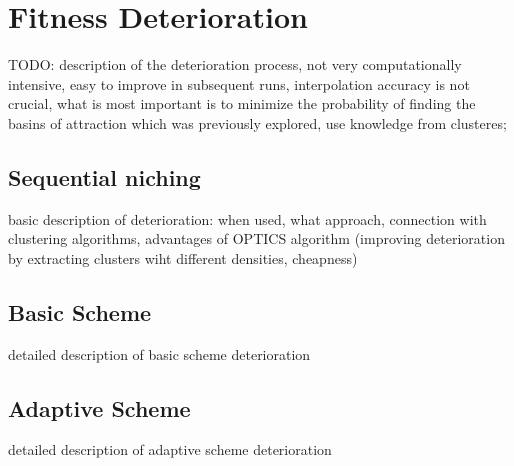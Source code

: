 

\chapter{Fitness Deterioration}
\label{FitnessDeterioration}

TODO: description of the deterioration process,
not very computationally intensive,
easy to improve in subsequent runs,
interpolation accuracy is not crucial, what is most important is to
minimize the probability of finding the basins of attraction which was
previously explored,
use knowledge from clusteres;

 
\section{Sequential niching}

basic description of deterioration: 
when used, what approach,
connection with clustering algorithms,
advantages of OPTICS algorithm (improving deterioration by extracting clusters
wiht different densities, cheapness)

\section{Basic Scheme}

detailed description of basic scheme deterioration

\section{Adaptive Scheme}

detailed description of adaptive scheme deterioration
